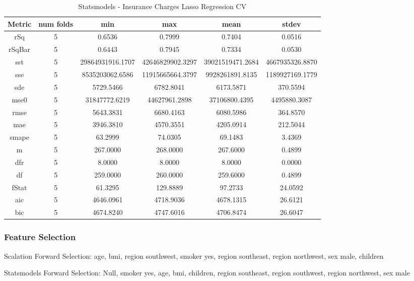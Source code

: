 \documentclass{article}
\begin{document}
\begin{table}[H]
\centering
\caption{Statsmodels - Insurance Charges Lasso Regression CV}
\label{tab:Statsmodels - Insurance Charges Lasso Regression CV}
\begin{tabular}{|c|c|c|c|c|c|}\hline
Metric & num folds & min & max & mean & stdev \\ \hline \hline
rSq & 5 & 0.6536 & 0.7999 & 0.7404 & 0.0516 \\ \hline
rSqBar & 5 & 0.6443 & 0.7945 & 0.7334 & 0.0530 \\ \hline
sst & 5 & 29864931916.1707 & 42646829902.3297 & 39021519471.2684 & 4667935326.8870 \\ \hline
sse & 5 & 8535203062.6586 & 11915665664.3797 & 9928261891.8135 & 1189927169.1779 \\ \hline
sde & 5 & 5729.5466 & 6782.8041 & 6173.5871 & 370.5594 \\ \hline
mse0 & 5 & 31847772.6219 & 44627961.2898 & 37106800.4395 & 4495880.3087 \\ \hline
rmse & 5 & 5643.3831 & 6680.4163 & 6080.5986 & 364.8570 \\ \hline
mae & 5 & 3946.3810 & 4570.3551 & 4205.0914 & 212.5044 \\ \hline
smape & 5 & 63.2999 & 74.0305 & 69.1483 & 3.4369 \\ \hline
m & 5 & 267.0000 & 268.0000 & 267.6000 & 0.4899 \\ \hline
dfr & 5 & 8.0000 & 8.0000 & 8.0000 & 0.0000 \\ \hline
df & 5 & 259.0000 & 260.0000 & 259.6000 & 0.4899 \\ \hline
fStat & 5 & 61.3295 & 129.8889 & 97.2733 & 24.0592 \\ \hline
aic & 5 & 4646.0961 & 4718.9036 & 4678.1315 & 26.6121 \\ \hline
bic & 5 & 4674.8240 & 4747.6016 & 4706.8474 & 26.6047 \\ \hline
\end{tabular}
\end{table}

\subsubsection{Feature Selection}

Scalation Forward Selection: age, bmi, region southwest, smoker yes, region southeast, region northwest, sex male, children

Statsmodels Forward Selection: Null, smoker yes, age, bmi, children, region southeast, region southwest, region northwest, sex male
\end{document}
